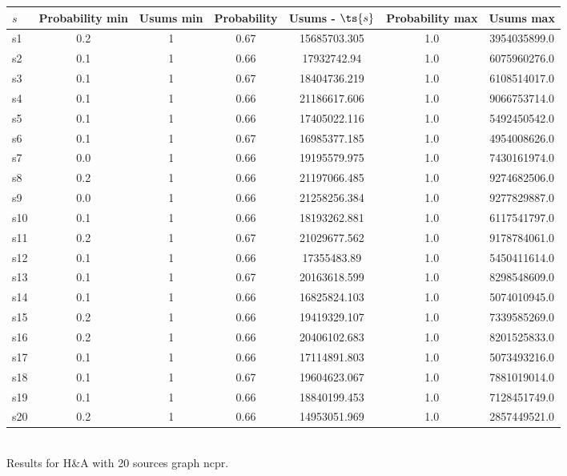 \documentclass{article}
\begin{document}
\noindent\begin{tabular}{|l|c|c|c|c|c|c|}
\hline
$s$& Probability min & Usums min & Probability & Usums - $\ts{s}$ & Probability max & Usums max\\
\hline
s1 &0.2 & 1 & 0.67 & 15685703.305 & 1.0 & 3954035899.0\\
\hline
s2 &0.1 & 1 & 0.66 & 17932742.94 & 1.0 & 6075960276.0\\
\hline
s3 &0.1 & 1 & 0.67 & 18404736.219 & 1.0 & 6108514017.0\\
\hline
s4 &0.1 & 1 & 0.66 & 21186617.606 & 1.0 & 9066753714.0\\
\hline
s5 &0.1 & 1 & 0.66 & 17405022.116 & 1.0 & 5492450542.0\\
\hline
s6 &0.1 & 1 & 0.67 & 16985377.185 & 1.0 & 4954008626.0\\
\hline
s7 &0.0 & 1 & 0.66 & 19195579.975 & 1.0 & 7430161974.0\\
\hline
s8 &0.2 & 1 & 0.66 & 21197066.485 & 1.0 & 9274682506.0\\
\hline
s9 &0.0 & 1 & 0.66 & 21258256.384 & 1.0 & 9277829887.0\\
\hline
s10 &0.1 & 1 & 0.66 & 18193262.881 & 1.0 & 6117541797.0\\
\hline
s11 &0.2 & 1 & 0.67 & 21029677.562 & 1.0 & 9178784061.0\\
\hline
s12 &0.1 & 1 & 0.66 & 17355483.89 & 1.0 & 5450411614.0\\
\hline
s13 &0.1 & 1 & 0.67 & 20163618.599 & 1.0 & 8298548609.0\\
\hline
s14 &0.1 & 1 & 0.66 & 16825824.103 & 1.0 & 5074010945.0\\
\hline
s15 &0.2 & 1 & 0.66 & 19419329.107 & 1.0 & 7339585269.0\\
\hline
s16 &0.2 & 1 & 0.66 & 20406102.683 & 1.0 & 8201525833.0\\
\hline
s17 &0.1 & 1 & 0.66 & 17114891.803 & 1.0 & 5073493216.0\\
\hline
s18 &0.1 & 1 & 0.67 & 19604623.067 & 1.0 & 7881019014.0\\
\hline
s19 &0.1 & 1 & 0.66 & 18840199.453 & 1.0 & 7128451749.0\\
\hline
s20 &0.2 & 1 & 0.66 & 14953051.969 & 1.0 & 2857449521.0\\
\hline
\end{tabular}\\

\noindent Results for H\&A with 20 sources graph ncpr.
\end{document}
